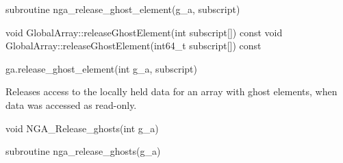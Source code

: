 \documentclass[12pt]{article}
\begin{document}
\begin{fapi}
\begin{fcode}
subroutine nga_release_ghost_element(g_a, subscript)
\end{fcode}
\begin{funcargs}
\end{funcargs}
\end{fapi}

\begin{cxxapi}
\begin{cxxcode}
void GlobalArray::releaseGhostElement(int subscript[]) const
void GlobalArray::releaseGhostElement(int64_t subscript[]) const
\end{cxxcode}
\begin{funcargs}
\end{funcargs}
\end{cxxapi}

\begin{pyapi}
\begin{pycode}
ga.release_ghost_element(int g_a, subscript)
\end{pycode}
\begin{funcargs}
\end{funcargs}
\end{pyapi}

\local

\begin{desc}

Releases access to the locally held data for an array with ghost elements, when
data was accessed as read-only.

\end{desc}



\begin{capi}
\begin{ccode}
void NGA_Release_ghosts(int g_a)
\end{ccode}
\begin{funcargs}
\end{funcargs}
\end{capi}

\begin{fapi}
\begin{fcode}
subroutine nga_release_ghosts(g_a)
\end{fcode}
\begin{funcargs}
\end{funcargs}
\end{fapi}
\end{document}
